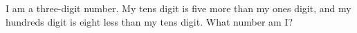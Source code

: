 I am a three-digit number. My tens digit is five more than my ones digit, and my hundreds digit is eight less than my tens digit. What number am I?
